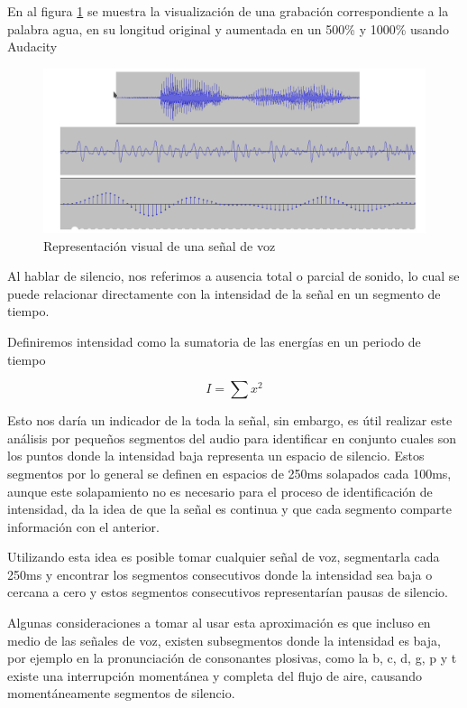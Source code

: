 \documentclass[a4paper,12pt,twoside]{report}
\begin{document}
En al figura \ref{img:pcm} se muestra la visualización de una grabación correspondiente a la palabra agua, en su longitud original y aumentada en un 500\% y 1000\% usando Audacity \cite{audacity}
\begin{figure}[H]
\caption{Representación visual de una señal de voz \cite{hableomsDeVoz}}
\label{img:pcm}
\includegraphics[width=\textwidth]{imagenes/04_01_pcm.png}
\end{figure}

Al hablar de silencio, nos referimos a ausencia total o parcial de sonido, lo cual se puede relacionar directamente con la intensidad de la señal en un segmento de tiempo.

Definiremos intensidad como la sumatoria de las energías en un periodo de tiempo  \cite{Jurafsky2000SpeechRecognition}    

\begin{equation}
\label{eq:energy}
I = \sum{x^2}  
\end{equation}

Esto nos daría un indicador de la toda la señal, sin embargo, es útil realizar este análisis por pequeños segmentos del audio para identificar en conjunto cuales son los puntos donde la intensidad baja representa un espacio de silencio. Estos segmentos por lo general se definen en espacios de 250ms solapados cada 100ms, aunque este solapamiento no es necesario para el proceso de identificación de intensidad, da la idea de que la señal es continua y que cada segmento comparte información con el anterior.

Utilizando esta idea es posible tomar cualquier señal de voz, segmentarla cada 250ms y encontrar los segmentos consecutivos donde la intensidad sea baja o cercana a cero y estos segmentos consecutivos representarían pausas de silencio.

Algunas consideraciones a tomar al usar esta aproximación es que incluso en medio de las señales de voz, existen subsegmentos donde la intensidad es baja, por ejemplo en la pronunciación de consonantes plosivas, como la b, c, d, g, p y t existe una interrupción momentánea y completa del flujo de aire, causando momentáneamente segmentos de silencio.
\end{document}
